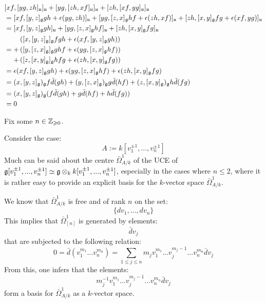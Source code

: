             $$
                \begin{aligned}
                    & [xf, [yg, zh]_{\mathfrak{u}}]_{\mathfrak{u}} + [yg, [zh, xf]_{\mathfrak{u}}]_{\mathfrak{u}} + [zh, [xf, yg]_{\mathfrak{u}}]_{\mathfrak{u}}
                    \\
                    & = [xf, [y, z]_{\mathfrak{g}} gh + \epsilon(yg, zh)]_{\mathfrak{u}} + [yg, [z, x]_{\mathfrak{g}} hf + \epsilon(zh, xf)]_{\mathfrak{u}} + [zh, [x, y]_{\mathfrak{g}} fg + \epsilon(xf, yg)]_{\mathfrak{u}}
                    \\
                    & = [xf, [y, z]_{\mathfrak{g}} gh]_{\mathfrak{u}} + [yg, [z, x]_{\mathfrak{g}} hf]_{\mathfrak{u}} + [zh, [x, y]_{\mathfrak{g}} fg]_{\mathfrak{u}}
                    \\
                    & = 
                    \begin{aligned}
                        & \left( [x, [y, z]_{\mathfrak{g}}]_{\mathfrak{g}} fgh + \epsilon(xf, [y, z]_{\mathfrak{g}} gh) \right)
                        \\
                        + & \left( [y, [z, x]_{\mathfrak{g}}]_{\mathfrak{g}} ghf + \epsilon(yg, [z, x]_{\mathfrak{g}} hf) \right)
                        \\
                        + & \left( [z, [x, y]_{\mathfrak{g}}]_{\mathfrak{g}} hfg + \epsilon(zh, [x, y]_{\mathfrak{g}} fg) \right)
                    \end{aligned}
                    \\
                    & = \epsilon(xf, [y, z]_{\mathfrak{g}} gh) + \epsilon(yg, [z, x]_{\mathfrak{g}} hf) + \epsilon(zh, [x, y]_{\mathfrak{g}} fg)
                    \\
                    & = (x, [y, z]_{\mathfrak{g}})_{\mathfrak{g}} f \bar{d}(gh) + (y, [z, x]_{\mathfrak{g}})_{\mathfrak{g}} g \bar{d}(hf) + (z, [x, y]_{\mathfrak{g}})_{\mathfrak{g}} h \bar{d}(fg)
                    \\
                    & = (x, [y, z]_{\mathfrak{g}})_{\mathfrak{g}} ( f \bar{d}(gh) + g \bar{d}(hf) + h \bar{d}(fg) )
                    \\
                    & = 0
                \end{aligned}
            $$
        \begin{example}
            Fix some $n \in \mathbb{Z}_{\geqslant 0}$.
        
            Consider the case:
                $$A := k[v_1^{\pm 1}, ..., v_n^{\pm 1}]$$
            Much can be said about the centre $\bar{\Omega}^1_{A/k}$ of the UCE of $\g[v_1^{\pm 1}, ..., v_n^{\pm 1}] \cong \g \tensor_k k[v_1^{\pm 1}, ..., v_n^{\pm 1}]$, especially in the cases where $n \leq 2$, where it is rather easy to provide an explicit basis for the $k$-vector space $\bar{\Omega}^1_{A/k}$. 

            We know that $\bar{\Omega}^1_{A/k}$ is free and of rank $n$ on the set:
                $$\{dv_1, ..., dv_n\}$$
            This implies that $\bar{\Omega}^1_{[n]}$ is generated by elements:
                $$\bar{d}v_j$$
            that are subjected to the following relation:
                $$0 = \bar{d}( v_1^{m_1} ... v_n^{m_n} ) = \sum_{1 \leq j \leq n} m_j v_1^{m_1} ... v_j^{m_j - 1} ... v_n^{m_n} \bar{d}v_j$$
            From this, one infers that the elements:
                $$m_j^{-1} v_1^{m_1} ... v_j^{m_j - 1} ... v_n^{m_n} \bar{d}v_j$$
            form a basis for $\bar{\Omega}^1_{A/k}$ as a $k$-vector space.
        \end{example}
